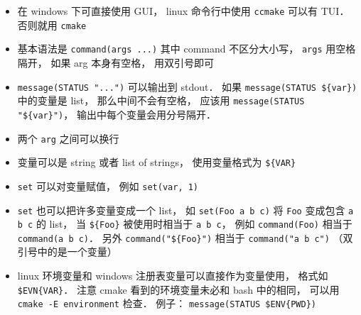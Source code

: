 

\begin{itemize}
\item 在 windows 下可直接使用 GUI， linux 命令行中使用 \verb`ccmake` 可以有 TUI． 否则就用 \verb`cmake`
\item 基本语法是 \verb`command(args ...)` 其中 command 不区分大小写， \verb`args` 用空格隔开， 如果 arg 本身有空格， 用双引号即可
\item \verb`message(STATUS "...")` 可以输出到 stdout． 如果 \verb`message(STATUS ${var})` 中的变量是 list， 那么中间不会有空格， 应该用 \verb`message(STATUS "${var}")`， 输出中每个变量会用分号隔开．
\item 两个 \verb`arg` 之间可以换行
\item 变量可以是 string 或者 list of strings， 使用变量格式为 \verb`${VAR}`
\item \verb`set` 可以对变量赋值， 例如 \verb`set(var, 1)`
\item \verb`set` 也可以把许多变量变成一个 list， 如 \verb`set(Foo a b c)` 将 \verb`Foo` 变成包含 \verb`a b c` 的 list， 当 \verb`${Foo}` 被使用时相当于 \verb`a b c`， 例如 \verb`command(Foo)` 相当于 \verb`command(a b c)`． 另外 \verb`command("${Foo}")` 相当于 \verb`command("a b c")` （双引号中的是一个变量）
\item linux 环境变量和 windows 注册表变量可以直接作为变量使用， 格式如 \verb`$EVN{VAR}`． 注意 cmake 看到的环境变量未必和 bash 中的相同， 可以用 \verb`cmake -E environment` 检查． 例子： \verb|message(STATUS $ENV{PWD})|
\end{itemize}

